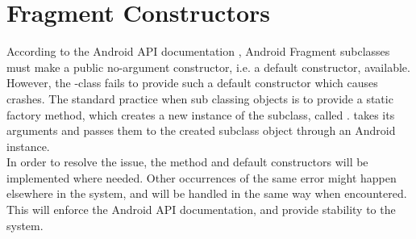 
\section{Fragment Constructors}
\label{sec:fragment_constructors}

According to the Android API documentation \parencite{android_dev_fragment}, Android Fragment subclasses must make a public no-argument constructor, i.e. a default constructor, available. However, the \giraf-class  fails to provide such a default constructor which causes crashes. The standard practice when sub classing  objects is to provide a static factory method, which creates a new instance of the  subclass, called .  takes its arguments and passes them to the created  subclass object through an Android  instance. \\

In order to resolve the issue, the  method and default constructors will be implemented where needed. Other occurrences of the same error might happen elsewhere in the system, and will be handled in the same way when encountered. This will enforce the Android API documentation, and provide stability to the system. 